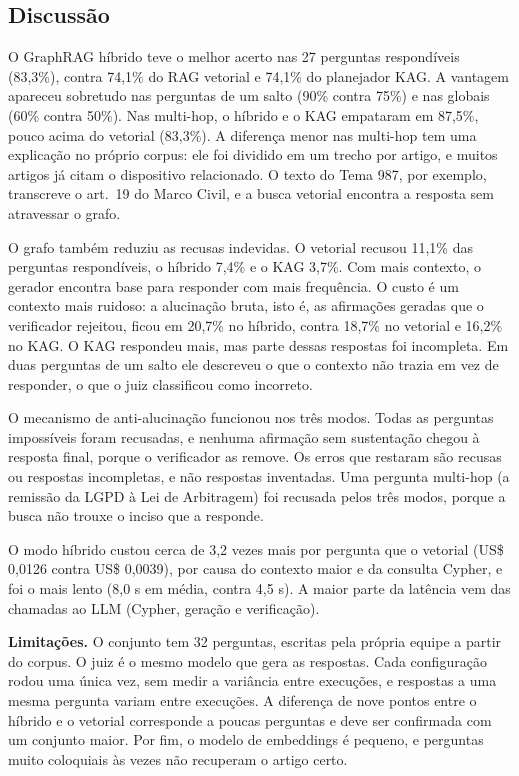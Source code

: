 \subsection{Discussão}

O GraphRAG híbrido teve o melhor acerto nas 27 perguntas respondíveis (83,3\%), contra 74,1\% do RAG vetorial
e 74,1\% do planejador KAG. A vantagem apareceu sobretudo nas perguntas de um salto (90\% contra 75\%) e nas
globais (60\% contra 50\%). Nas multi-hop, o híbrido e o KAG empataram em 87,5\%, pouco acima do vetorial
(83,3\%). A diferença menor nas multi-hop tem uma explicação no próprio corpus: ele foi dividido em um trecho
por artigo, e muitos artigos já citam o dispositivo relacionado. O texto do Tema 987, por exemplo, transcreve o
art.~19 do Marco Civil, e a busca vetorial encontra a resposta sem atravessar o grafo.

O grafo também reduziu as recusas indevidas. O vetorial recusou 11,1\% das perguntas respondíveis, o híbrido
7,4\% e o KAG 3,7\%. Com mais contexto, o gerador encontra base para responder com mais frequência. O custo é
um contexto mais ruidoso: a alucinação bruta, isto é, as afirmações geradas que o verificador rejeitou, ficou
em 20,7\% no híbrido, contra 18,7\% no vetorial e 16,2\% no KAG. O KAG respondeu mais, mas parte dessas respostas
foi incompleta. Em duas perguntas de um salto ele descreveu o que o contexto não trazia em vez de responder, o
que o juiz classificou como incorreto.

O mecanismo de anti-alucinação funcionou nos três modos. Todas as perguntas impossíveis foram recusadas, e
nenhuma afirmação sem sustentação chegou à resposta final, porque o verificador as remove. Os erros que restaram
são recusas ou respostas incompletas, e não respostas inventadas. Uma pergunta multi-hop (a remissão da LGPD à
Lei de Arbitragem) foi recusada pelos três modos, porque a busca não trouxe o inciso que a responde.

O modo híbrido custou cerca de 3,2 vezes mais por pergunta que o vetorial (US\$ 0,0126 contra US\$ 0,0039), por
causa do contexto maior e da consulta Cypher, e foi o mais lento (8,0 s em média, contra 4,5 s). A maior parte da
latência vem das chamadas ao LLM (Cypher, geração e verificação).

\textbf{Limitações.} O conjunto tem 32 perguntas, escritas pela própria equipe a partir do corpus. O juiz é o
mesmo modelo que gera as respostas. Cada configuração rodou uma única vez, sem medir a variância entre execuções,
e respostas a uma mesma pergunta variam entre execuções. A diferença de nove pontos entre o híbrido e o vetorial
corresponde a poucas perguntas e deve ser confirmada com um conjunto maior. Por fim, o modelo de embeddings é
pequeno, e perguntas muito coloquiais às vezes não recuperam o artigo certo.
